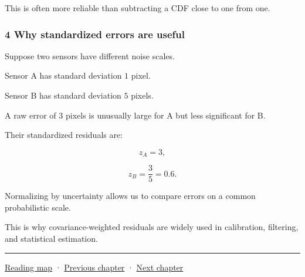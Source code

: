 This is often more reliable than subtracting a CDF close to one from one.

\subsubsection{4 Why standardized errors are useful}\label{02-foundations-ii-ch023-why-standardized-errors-are-useful}

\hypertarget{02-foundations-ii-ch023-why-standardized-errors-are-useful}{}

Suppose two sensors have different noise scales.

Sensor A has standard deviation \(1\) pixel.

Sensor B has standard deviation \(5\) pixels.

A raw error of \(3\) pixels is unusually large for A but less significant for B.

Their standardized residuals are:

\[
 z_A=3,
\]

\[
 z_B=\frac35=0.6.
\]

Normalizing by uncertainty allows us to compare errors on a common probabilistic scale.

This is why covariance-weighted residuals are widely used in calibration, filtering, and statistical estimation.

\begin{center}\rule{0.5\linewidth}{0.5pt}\end{center}

\hyperref[volume-reading-map]{Reading map} · \hyperref[02-foundations-ii-ch022-accumulation-quadrature-and-the-bridge-to-probability]{Previous chapter} · \hyperref[02-foundations-ii-ch024-waiting-times-covariance-and-matrix-decomposition]{Next chapter}
